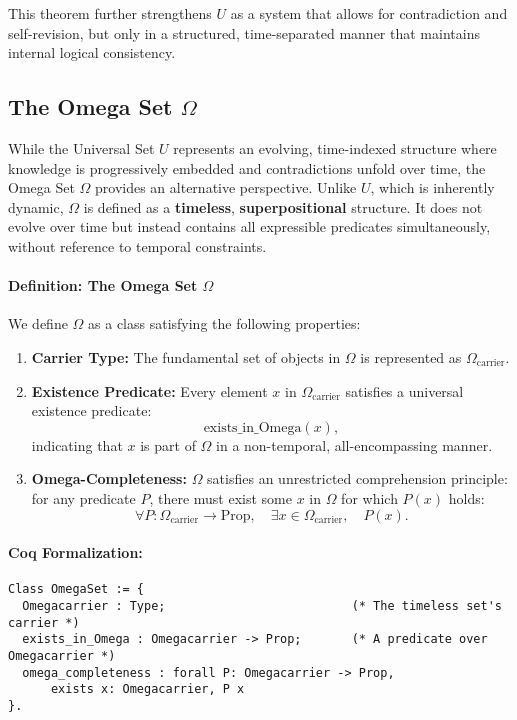 \documentclass[12pt]{article}
\begin{document}
This theorem further strengthens \( U \) as a system that allows for contradiction and self-revision, but only in a structured, time-separated manner that maintains internal logical consistency.


\subsection{The Omega Set \( \Omega \)}

While the Universal Set \( U \) represents an evolving, time-indexed structure where knowledge is progressively embedded and contradictions unfold over time, the Omega Set \( \Omega \) provides an alternative perspective. Unlike \( U \), which is inherently dynamic, \( \Omega \) is defined as a \textbf{timeless}, \textbf{superpositional} structure. It does not evolve over time but instead contains all expressible predicates simultaneously, without reference to temporal constraints.

\paragraph{Definition: The Omega Set \( \Omega \)}
We define \( \Omega \) as a class satisfying the following properties:

\begin{enumerate}
    \item \textbf{Carrier Type:} The fundamental set of objects in \( \Omega \) is represented as \( \Omega_{\text{carrier}} \).
    \item \textbf{Existence Predicate:} Every element \( x \) in \( \Omega_{\text{carrier}} \) satisfies a universal existence predicate:
    \[
    \text{exists\_in\_Omega}(x),
    \]
    indicating that \( x \) is part of \( \Omega \) in a non-temporal, all-encompassing manner.
    \item \textbf{Omega-Completeness:} \( \Omega \) satisfies an unrestricted comprehension principle: for any predicate \( P \), there must exist some \( x \) in \( \Omega \) for which \( P(x) \) holds:
    \begin{equation}
        \forall P: \Omega_{\text{carrier}} \to \text{Prop}, \quad
        \exists x \in \Omega_{\text{carrier}}, \quad P(x).
    \end{equation}
\end{enumerate}

\paragraph{Coq Formalization:}
\begin{lstlisting}[language=Coq]
Class OmegaSet := {
  Omegacarrier : Type;                          (* The timeless set's carrier *)
  exists_in_Omega : Omegacarrier -> Prop;       (* A predicate over Omegacarrier *)
  omega_completeness : forall P: Omegacarrier -> Prop,
      exists x: Omegacarrier, P x
}.
\end{lstlisting}
\end{document}
